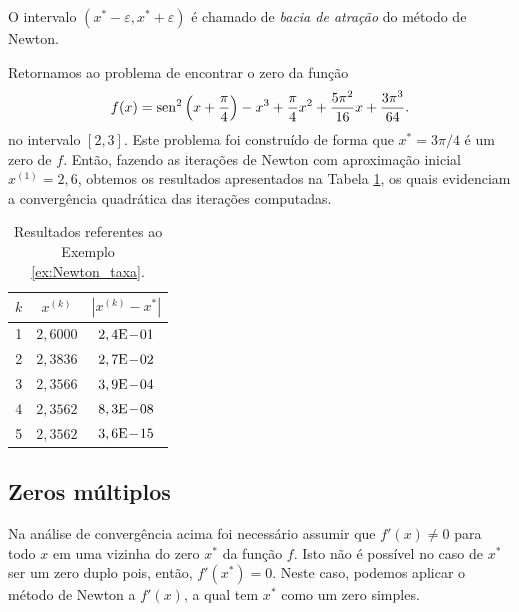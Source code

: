 \begin{obs}
  O intervalo $(x^*-\varepsilon, x^*+\varepsilon)$ é chamado de \emph{bacia de atração} do método de Newton.
\end{obs}

\begin{ex}\label{ex:Newton_taxa}
  Retornamos ao problema de encontrar o zero da função
  \begin{equation}
    f(x) = \operatorname{sen}^2\left(x+\frac{\pi}{4}\right) - x^3 + \frac{\pi}{4}x^2 + \frac{5\pi^2}{16}x + \frac{3\pi^3}{64}.
  \end{equation}
  no intervalo $[2,3]$. Este problema foi construído de forma que $x^* = 3\pi/4$ é um zero de $f$. Então, fazendo as iterações de Newton com aproximação inicial $x^{(1)}=2,6$, obtemos os resultados apresentados na Tabela \ref{tab:ex_Newton_taxa}, os quais evidenciam a convergência quadrática das iterações computadas.

\begin{table}[h!]
  \centering
  \caption{Resultados referentes ao Exemplo \ref{ex:Newton_taxa}.}
  \label{tab:ex_Newton_taxa}
  \begin{tabular}{r|cc}
    $k$ & $x^{(k)}$ & $|x^{(k)}-x^*|$ \\\hline
    1 & $2,6000$ & $2,4\mathrm{E}\!-\!01$ \\
    2 & $2,3836$ & $2,7\mathrm{E}\!-\!02$ \\
    3 & $2,3566$ & $3,9\mathrm{E}\!-\!04$ \\
    4 & $2,3562$ & $8,3\mathrm{E}\!-\!08$ \\
    5 & $2,3562$ & $3,6\mathrm{E}\!-\!15$ \\\hline
  \end{tabular}
\end{table}

% 
\end{ex}

\subsection{Zeros múltiplos}

Na análise de convergência acima foi necessário assumir que $f'(x) \neq 0$ para todo $x$ em uma vizinha do zero $x^*$ da função $f$. Isto não é possível no caso de $x^*$ ser um zero duplo pois, então, $f'(x^*) = 0$. Neste caso, podemos aplicar o método de Newton a $f'(x)$, a qual tem $x^*$ como um zero simples.


